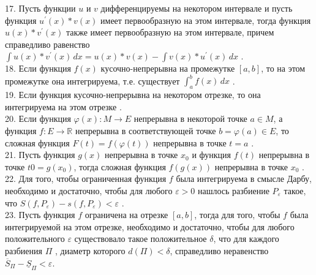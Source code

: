 \documentclass[12pt]{article}
\begin{document}
17. Пусть функции ${\displaystyle u}$ и ${\displaystyle v}$ дифференцируемы на некотором интервале и пусть функция ${\displaystyle u^{\prime}(x)*v(x)}$ имеет первообразную на этом интервале, тогда функция ${\displaystyle u(x)*v^{\prime}(x)}$ также имеет первообразную на этом интервале, причем справедливо равенство ${\displaystyle \int \limits u(x)*v^{\prime}(x) \, dx=u(x)*v(x)-\int \limits v(x)*u^{\prime}(x)\, dx}$ .\\

18. Если функция ${\displaystyle f(x)}$ кусочно-непрерывна на промежутке ${\displaystyle [a,b]}$, то на этом промежутке она интегрируема, т.е. существует ${\displaystyle \int _{a}^{b} f(x) \, dx}$ .\\

19. Если функция кусочно-непрерывна на некотором отрезке, то она интегрируема на этом отрезке .\\

20. Если функция ${\displaystyle \varphi(x)\colon M \to E}$ непрерывна в некоторой точке ${\displaystyle a \in M}$, а функция ${\displaystyle f \colon E \to \mathbb{R}}$ непрерывна в соответствующей точке ${\displaystyle b=\varphi(a) \in E}$, то сложная функция ${\displaystyle F(t)=f(\varphi(t))}$ непрерывна в точке ${\displaystyle t=a}$ .\\

21. Пусть функция ${\displaystyle g(x)}$  непрерывна в точке ${\displaystyle x_0}$ и функция ${\displaystyle f(t)}$  непрерывна в точке ${\displaystyle t0 = g(x_0)}$, тогда сложная функция  ${\displaystyle f(g(x))}$ непрерывна в точке ${\displaystyle x_0}$ .\\

22. Для того, чтобы ограниченная функция ${\displaystyle f}$ была интегрируема в смысле Дарбу, необходимо и достаточно, чтобы для любого ${\displaystyle \varepsilon>0}$ нашлось разбиение ${\displaystyle P_{\varepsilon}}$ такое, что ${\displaystyle S(f, P_{\varepsilon})-s(f, P_{\varepsilon})<\varepsilon}$ .\\

23. Пусть функция ${\displaystyle f}$ ограничена на отрезке ${\displaystyle \left[ {a,b} \right]}$, тогда для того, чтобы ${\displaystyle f}$ была интегрируемой на этом отрезке, необходимо и достаточно, чтобы  для любого положительного ${\displaystyle \varepsilon}$ существовало такое положительное ${\displaystyle \delta}$, что для каждого разбиения ${\displaystyle \Pi}$ , диаметр которого ${\displaystyle d\left( \Pi \right) < \delta}$, справедливо неравенство ${\displaystyle {\overline S_{\Pi} } - {\underline S_{\Pi}} < \varepsilon}$.\\
\end{document}
